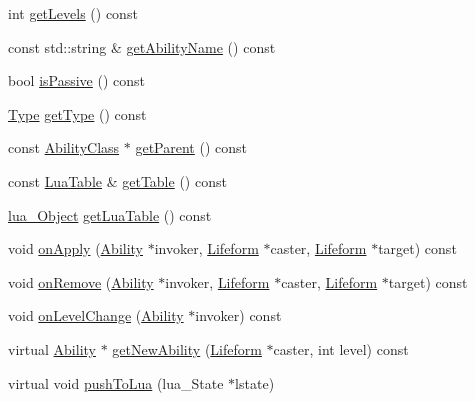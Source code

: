 \begin{DoxyCompactItemize}
\item 
int \hyperlink{classZeta_1_1AbilityClass_a727597e2c4d3452ca33b8754b61fc6fc}{get\+Levels} () const 
\item 
const std\+::string \& \hyperlink{classZeta_1_1AbilityClass_a3035a01ec5eb65fe6429147e96edf9e9}{get\+Ability\+Name} () const 
\item 
bool \hyperlink{classZeta_1_1AbilityClass_acaaa4b554085556b2bf56e6cf2c2e960}{is\+Passive} () const 
\item 
\hyperlink{classZeta_1_1AbilityClass_a371c2c662780f1c4a796a3332d6568b3}{Type} \hyperlink{classZeta_1_1AbilityClass_a36853a94f0caffa6ac3f31c38e5bdcda}{get\+Type} () const 
\item 
const \hyperlink{classZeta_1_1AbilityClass}{Ability\+Class} $\ast$ \hyperlink{classZeta_1_1AbilityClass_aadac51d50e52982bc72a2a91e9bc33c4}{get\+Parent} () const 
\item 
const \hyperlink{classZeta_1_1LuaTable}{Lua\+Table} \& \hyperlink{classZeta_1_1AbilityClass_a6442689e370a2843fe2b7e3d14c957a3}{get\+Table} () const 
\item 
\hyperlink{ZetaConfig_8hpp_ae7be32b73848041a60f2412f72bbb221}{lua\+\_\+\+Object} \hyperlink{classZeta_1_1AbilityClass_a32bf638f5d5c1430e369943d43ce00fe}{get\+Lua\+Table} () const 
\item 
void \hyperlink{classZeta_1_1AbilityClass_a36fbfde58302cc1ad1fd728d25865973}{on\+Apply} (\hyperlink{classZeta_1_1Ability}{Ability} $\ast$invoker, \hyperlink{classZeta_1_1Lifeform}{Lifeform} $\ast$caster, \hyperlink{classZeta_1_1Lifeform}{Lifeform} $\ast$target) const 
\item 
void \hyperlink{classZeta_1_1AbilityClass_a16f5bd30070add8d629a05d2de54b8f5}{on\+Remove} (\hyperlink{classZeta_1_1Ability}{Ability} $\ast$invoker, \hyperlink{classZeta_1_1Lifeform}{Lifeform} $\ast$caster, \hyperlink{classZeta_1_1Lifeform}{Lifeform} $\ast$target) const 
\item 
void \hyperlink{classZeta_1_1AbilityClass_a6ab615405530bc3ab616ebc555a70904}{on\+Level\+Change} (\hyperlink{classZeta_1_1Ability}{Ability} $\ast$invoker) const 
\item 
virtual \hyperlink{classZeta_1_1Ability}{Ability} $\ast$ \hyperlink{classZeta_1_1AbilityClass_a15470bcd0795b12410e6f138a1b1a804}{get\+New\+Ability} (\hyperlink{classZeta_1_1Lifeform}{Lifeform} $\ast$caster, int level) const 
\item 
virtual void \hyperlink{classZeta_1_1AbilityClass_a3535ae18fef8d447febab98c85e169f3}{push\+To\+Lua} (lua\+\_\+\+State $\ast$lstate)

\end{DoxyCompactItemize}
